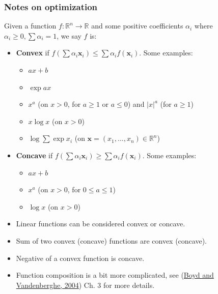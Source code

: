 \documentclass[ignorenonframetext,plain,fleqn]{beamer}
\renewcommand{\vec}{\mathbf}
\begin{document}
\begin{frame}\frametitle{Notes on optimization}
Given a function $f:\mathbb{R}^n\rightarrow\mathbb{R}$ and some
positive coefficients $\alpha_i$ where $\alpha_i \geq 0, \sum \alpha_i
= 1$, we say $f$ is:
\begin{itemize}
\item {\bf Convex} if
$  
f(\sum \alpha_i \vec{x}_i) \leq \sum \alpha_i f(\vec{x}_i)
$.  Some examples:
\begin{itemize}
\item $ax+b$
\item $\exp ax$
\item $x^a$ (on $x>0$, for $a\geq 1$ or $a\leq 0$) and $|x|^a$ (for $a\geq 1$)
\item $x\log x$ (on $x>0$)
\item $\log\sum\exp x_i$ (on $\vec{x}=(x_1,\dots,x_n) \in \mathbb{R}^n$)
\end{itemize}
\item {\bf Concave} if
$  
f(\sum \alpha_i \vec{x}_i) \geq \sum \alpha_i f(\vec{x}_i)
$.  Some examples:
\begin{itemize}
\item $ax+b$
\item $x^a$ (on $x>0$, for $0 \leq a\leq 1$)
\item $\log x$ (on $x>0$)
\end{itemize}
\item Linear functions can be considered convex or concave.
\item Sum of two convex (concave) functions are convex (concave).
\item Negative of a convex function is concave.
\item Function composition is a bit more complicated, see
  (\href{http://www.stanford.edu/~boyd/cvxbook}{Boyd and Vandenberghe,
  2004}) Ch. 3 for more details.
\end{itemize}
\end{frame}
\end{document}
